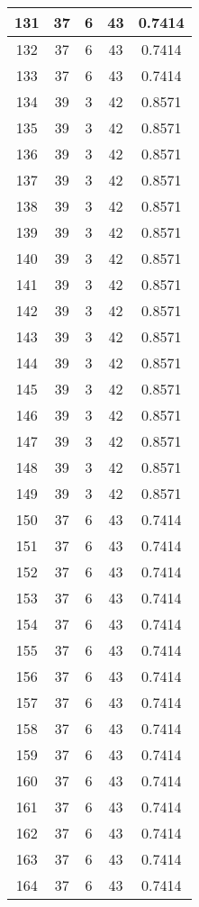 \documentclass[letterpaper, 12pt]{article}
\begin{document}
\begin{longtable}{|c|c|c|c|c|}
\hline
131 & 37 & 6 & 43 & 0.7414 \\
\hline
132 & 37 & 6 & 43 & 0.7414 \\
\hline
133 & 37 & 6 & 43 & 0.7414 \\
\hline
134 & 39 & 3 & 42 & 0.8571 \\
\hline
135 & 39 & 3 & 42 & 0.8571 \\
\hline
136 & 39 & 3 & 42 & 0.8571 \\
\hline
137 & 39 & 3 & 42 & 0.8571 \\
\hline
138 & 39 & 3 & 42 & 0.8571 \\
\hline
139 & 39 & 3 & 42 & 0.8571 \\
\hline
140 & 39 & 3 & 42 & 0.8571 \\
\hline
141 & 39 & 3 & 42 & 0.8571 \\
\hline
142 & 39 & 3 & 42 & 0.8571 \\
\hline
143 & 39 & 3 & 42 & 0.8571 \\
\hline
144 & 39 & 3 & 42 & 0.8571 \\
\hline
145 & 39 & 3 & 42 & 0.8571 \\
\hline
146 & 39 & 3 & 42 & 0.8571 \\
\hline
147 & 39 & 3 & 42 & 0.8571 \\
\hline
148 & 39 & 3 & 42 & 0.8571 \\
\hline
149 & 39 & 3 & 42 & 0.8571 \\
\hline
150 & 37 & 6 & 43 & 0.7414 \\
\hline
151 & 37 & 6 & 43 & 0.7414 \\
\hline
152 & 37 & 6 & 43 & 0.7414 \\
\hline
153 & 37 & 6 & 43 & 0.7414 \\
\hline
154 & 37 & 6 & 43 & 0.7414 \\
\hline
155 & 37 & 6 & 43 & 0.7414 \\
\hline
156 & 37 & 6 & 43 & 0.7414 \\
\hline
157 & 37 & 6 & 43 & 0.7414 \\
\hline
158 & 37 & 6 & 43 & 0.7414 \\
\hline
159 & 37 & 6 & 43 & 0.7414 \\
\hline
160 & 37 & 6 & 43 & 0.7414 \\
\hline
161 & 37 & 6 & 43 & 0.7414 \\
\hline
162 & 37 & 6 & 43 & 0.7414 \\
\hline
163 & 37 & 6 & 43 & 0.7414 \\
\hline
164 & 37 & 6 & 43 & 0.7414 \\

\end{longtable}
\end{document}
